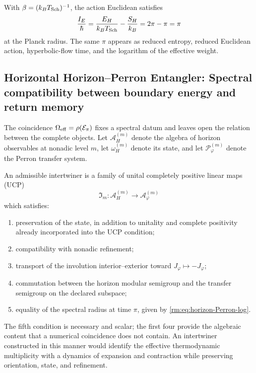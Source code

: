 With \(\beta=(k_BT_{\rm Sch})^{-1}\), the action Euclidean satisfies
\begin{equation}
 \frac{I_E}{\hbar}
 =\frac{E_H}{k_BT_{\rm Sch}}-\frac{S_H}{k_B}
 =2\pi-\pi=\pi
 \label{rm:eq:horizon-Schwarzschild-action}
\end{equation}
at the Planck radius. The same \(\pi\) appears as reduced entropy,
reduced Euclidean action, hyperbolic-flow time, and the logarithm of the
effective weight.

\subsection{Horizontal Horizon–Perron Entangler: Spectral compatibility between boundary energy and return memory}

The coincidence
\(\Omega_{\rm eff}=\rho(\mathcal E_\pi)\) fixes a spectral datum and leaves
open the relation between the complete objects. Let
\(\mathcal A_H^{(m)}\) denote the algebra of horizon observables at nonadic level
\(m\), let \(\omega_H^{(m)}\) denote its state, and let
\(\mathcal P_\varphi^{(m)}\) denote the Perron transfer system.

\begin{definition}
\label{rm:def:horizon-Perron-intertwiner}
An admissible intertwiner is a family of unital completely positive
linear maps (UCP)
\begin{equation}
 \mathfrak I_m:\mathcal A_H^{(m)}\longrightarrow
 \mathcal A_\varphi^{(m)}
 \label{rm:eq:horizon-intertwiner}
\end{equation}
which satisfies:
\begin{enumerate}[label=\roman*)]
 \item preservation of the state, in
addition to unitality and complete positivity already
incorporated into the UCP condition;
 \item compatibility with nonadic refinement;
 \item transport of the involution interior--exterior toward
       \(J_\varphi\mapsto-J_\varphi\);
 \item commutation between the horizon modular semigroup and the transfer
       semigroup on the declared subspace;
 \item equality of the spectral radius at time \(\pi\), given by
       \cref{rm:eq:horizon-Perron-log}.
\end{enumerate}
\end{definition}

The fifth condition is necessary and scalar; the first four provide the
algebraic content that a numerical coincidence does not contain. An
intertwiner constructed in this manner would identify the effective
thermodynamic multiplicity with a dynamics of expansion and contraction
while preserving orientation, state, and refinement.


